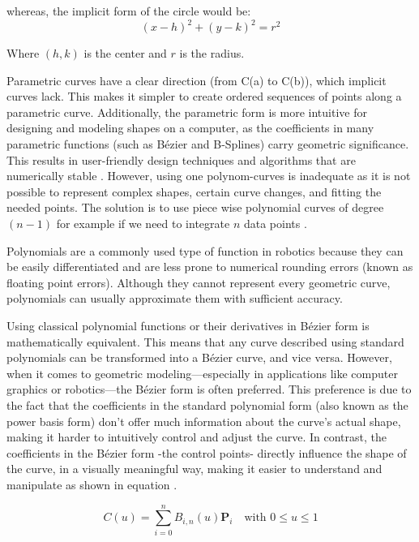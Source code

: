 whereas, the implicit form of the circle would be:
\begin{equation}
    (x - h)^2 + (y - k)^2 = r^2
\end{equation}

Where \((h,k)\) is the center and \(r\) is the radius.


Parametric curves have a clear direction (from C(a) to C(b)), which implicit curves lack. This makes 
it simpler to create ordered sequences of points along a parametric curve. Additionally, the parametric 
form is more intuitive for designing and modeling shapes on a computer, as the coefficients in many 
parametric functions (such as Bézier and B-Splines) carry geometric significance. This results in 
user-friendly design techniques and algorithms that are numerically stable \cite{R28}. 
However, using one polynom-curves is inadequate as it is not possible to represent complex shapes, certain 
curve changes, and fitting the needed points. 
The solution is to use piece wise polynomial curves of degree \((n-1)\) for example if we need to integrate
\(n\) data points \cite{R29}.

Polynomials are a commonly used type of function in robotics because they can be easily differentiated 
and are less prone to numerical rounding errors (known as floating point errors). Although they cannot 
represent every geometric curve, polynomials can usually approximate them with sufficient accuracy. 

Using classical polynomial functions or their derivatives in Bézier form is mathematically equivalent. 
This means that any curve described using standard polynomials can be transformed into a Bézier curve, 
and vice versa. However, when it comes to geometric modeling—especially in applications like computer 
graphics or robotics—the Bézier form is often preferred. This preference is due to the fact that the 
coefficients in the standard polynomial form (also known as the power basis form) don't offer much 
information about the curve's actual shape, making it harder to intuitively control and adjust the 
curve. In contrast, the coefficients in the Bézier form -the control points- directly influence the 
shape of the curve, in a visually meaningful way, making it easier to understand and manipulate 
as shown in equation  \cite{R28}. 

\begin{equation}
    C(u) = \sum_{i=0}^{n} B_{i,n}(u) \mathbf{P}_i \quad \text{with } 0 \leq u \leq 1 \label{Bezier curve}
\end{equation}

